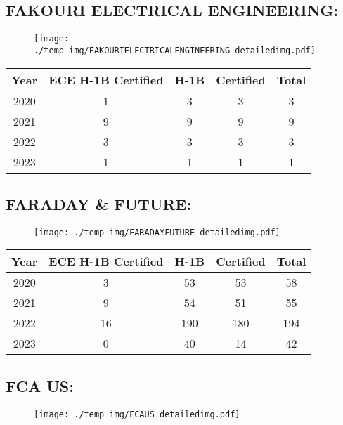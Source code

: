 \documentclass{article}%
\begin{document}
%
\newpage%
\subsection{FAKOURI ELECTRICAL ENGINEERING:}%
\label{subsec:FAKOURIELECTRICALENGINEERING}%
\label{FAKOURIELECTRICALENGINEERINGdetailed}%


\begin{figure}[htbp]%
\centering%
\texttt{[image: ./temp\_img/FAKOURIELECTRICALENGINEERING\_detailedimg.pdf]}%
\end{figure}

%
\begin{longtable}{c|c|c|c|c}%
\hline%
Year&ECE H{-}1B Certified&H{-}1B&Certified&Total\\%
\hline%
2020&1&3&3&3\\%
\hline%
2021&9&9&9&9\\%
\hline%
2022&3&3&3&3\\%
\hline%
2023&1&1&1&1\\%
\hline%
\end{longtable}

%
\newpage%
\subsection{FARADAY \& FUTURE:}%
\label{subsec:FARADAYFUTURE}%
\label{FARADAYFUTUREdetailed}%


\begin{figure}[htbp]%
\centering%
\texttt{[image: ./temp\_img/FARADAYFUTURE\_detailedimg.pdf]}%
\end{figure}

%
\begin{longtable}{c|c|c|c|c}%
\hline%
Year&ECE H{-}1B Certified&H{-}1B&Certified&Total\\%
\hline%
2020&3&53&53&58\\%
\hline%
2021&9&54&51&55\\%
\hline%
2022&16&190&180&194\\%
\hline%
2023&0&40&14&42\\%
\hline%
\end{longtable}

%
\newpage%
\subsection{FCA US:}%
\label{subsec:FCAUS}%
\label{FCAUSdetailed}%


\begin{figure}[htbp]%
\centering%
\texttt{[image: ./temp\_img/FCAUS\_detailedimg.pdf]}%
\end{figure}
\end{document}
